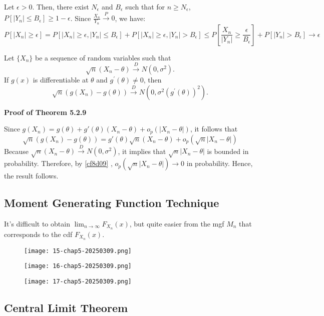 Let $\epsilon>0$. Then, there exist $N_{\epsilon}$ and $B_{\epsilon}$ such that for $n \geq N_{\epsilon}$, $P[|Y_n| \leq B_{\epsilon}] \geq 1-\epsilon$. Since $\frac{X_n}{Y_n} \xrightarrow{P} 0$, we have:
\[
P[|X_n| \geq \epsilon]=P[|X_n| \geq \epsilon,|Y_n| \leq B_{\epsilon}]+P[|X_n| \geq \epsilon,|Y_n| >B_{\epsilon}]\leq P\left[ \frac{X_n}{| Y_n |}\geq \frac{\epsilon}{B_{\epsilon}} \right]+P[| Y_n | >B_{\epsilon}]\to\epsilon
\]
\begin{theorem}
Let $\{X_n\}$ be a sequence of random variables such that
\[
\sqrt{n}(X_n-\theta) \xrightarrow{D} N(0, \sigma^2).
\]If $g(x)$ is differentiable at $\theta$ and $g^{\prime}(\theta) \neq 0$, then
\[
\sqrt{n}(g(X_n)-g(\theta)) \xrightarrow{D} N(0, \sigma^2(g^{\prime}(\theta))^2).
\]
\end{theorem}
\textbf{Proof of Theorem 5.2.9}

Since $g(X_n)=g(\theta)+g'(\theta)(X_n-\theta)+o_{p}(|X_n-\theta |)$, it follows that
\[
\sqrt{ n }(g(X_n)-g(\theta))=g'(\theta)\sqrt{ n }(X_n-\theta)+o_{p}(\sqrt{ n }|X_n-\theta |)
\]
Because $\sqrt{ n }(X_n-\theta)\overset{ D }{ \to }N(0,\sigma^{2})$, it implies that $\sqrt{ n }|X_n-\theta |$ is bounded in probability. Therefore, by \cref{cf8d09} , $o_{p}(\sqrt{ n }|X_n-\theta |)\to0$ in probability. Hence, the result follows.

\subsection{Moment Generating Function Technique}

It's difficult to obtain $\lim_{ n \to \infty }F_{X_n}(x)$, but quite easier from the mgf $M_n$ that corresponds to the cdf $F_{X_n}(x)$.

\begin{figure}[H]
\centering
\texttt{[image: 15-chap5-20250309.png]}
\label{}
\end{figure}

\begin{figure}[H]
\centering
\texttt{[image: 16-chap5-20250309.png]}
\label{}
\end{figure}

\begin{figure}[H]
\centering
\texttt{[image: 17-chap5-20250309.png]}
\label{}
\end{figure}

\subsection{Central Limit Theorem}


